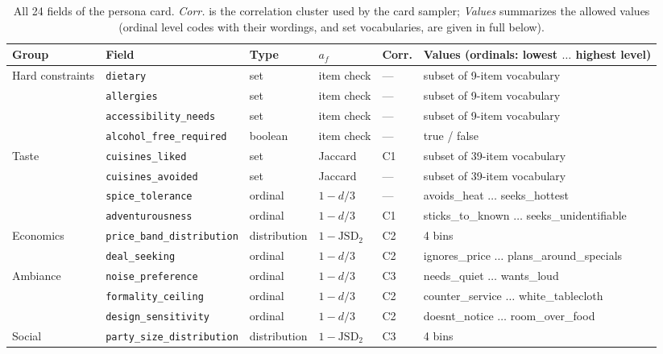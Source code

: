 \documentclass{article}
\begin{document}
\begin{table}[h]
  \centering
  \caption{All 24 fields of the persona card. \emph{Corr.} is the correlation cluster used by the
  card sampler; \emph{Values} summarizes the allowed values (ordinal level codes with their wordings, and set
  vocabularies, are given in full below).}
  \label{tab:allfields}
  \scriptsize
  \setlength{\tabcolsep}{4pt}
  \begin{tabular}{@{}llllll@{}}
    \toprule
    Group & Field & Type & $a_f$ & Corr. & Values (ordinals: lowest $\ldots$ highest level) \\
    \midrule
    \multirow{4}{*}{Hard constraints} & \texttt{dietary} & set & item check & --- & subset of 9-item vocabulary \\
     & \texttt{allergies} & set & item check & --- & subset of 9-item vocabulary \\
     & \texttt{accessibility\_needs} & set & item check & --- & subset of 9-item vocabulary \\
     & \texttt{alcohol\_free\_required} & boolean & item check & --- & true / false \\
    \midrule
    \multirow{4}{*}{Taste} & \texttt{cuisines\_liked} & set & Jaccard & C1 & subset of 39-item vocabulary \\
     & \texttt{cuisines\_avoided} & set & Jaccard & --- & subset of 39-item vocabulary \\
     & \texttt{spice\_tolerance} & ordinal & $1-d/3$ & --- & avoids\_heat $\ldots$ seeks\_hottest \\
     & \texttt{adventurousness} & ordinal & $1-d/3$ & C1 & sticks\_to\_known $\ldots$ seeks\_unidentifiable \\
    \midrule
    \multirow{2}{*}{Economics} & \texttt{price\_band\_distribution} & distribution & $1-\mathrm{JSD}_2$ & C2 & 4 bins \\
     & \texttt{deal\_seeking} & ordinal & $1-d/3$ & C2 & ignores\_price $\ldots$ plans\_around\_specials \\
    \midrule
    \multirow{3}{*}{Ambiance} & \texttt{noise\_preference} & ordinal & $1-d/3$ & C3 & needs\_quiet $\ldots$ wants\_loud \\
     & \texttt{formality\_ceiling} & ordinal & $1-d/3$ & C2 & counter\_service $\ldots$ white\_tablecloth \\
     & \texttt{design\_sensitivity} & ordinal & $1-d/3$ & C2 & doesnt\_notice $\ldots$ room\_over\_food \\
    \midrule
    \multirow{2}{*}{Social} & \texttt{party\_size\_distribution} & distribution & $1-\mathrm{JSD}_2$ & C3 & 4 bins \\

\end{tabular}
\end{table}
\end{document}
